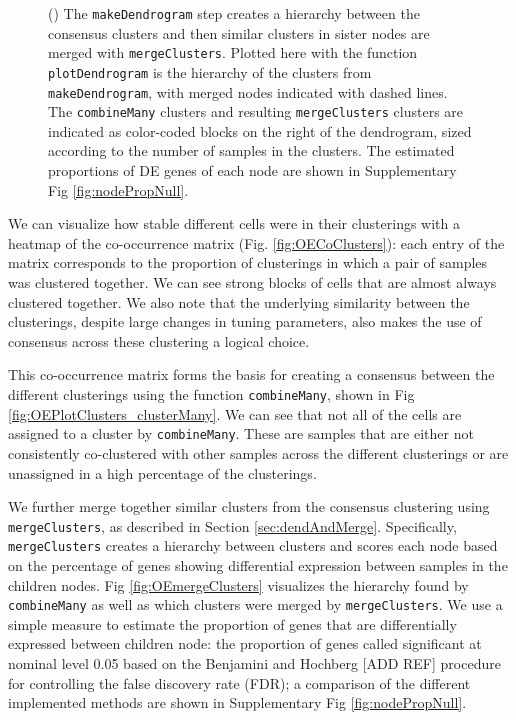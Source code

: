\documentclass[10pt,letterpaper]{article}
\newcommand{\f}[1]{\texttt{#1}}
\begin{document}
\begin{figure}
{(\protect{}) The \f{makeDendrogram} step creates a hierarchy between the consensus clusters and then similar clusters in sister nodes are merged with \f{mergeClusters}. Plotted here with the function \f{plotDendrogram} is the hierarchy of the clusters from \f{makeDendrogram}, with merged nodes indicated with dashed lines. The \f{combineMany} clusters and resulting \f{mergeClusters} clusters are indicated as color-coded blocks on the right of the dendrogram, sized according to the number of samples in the clusters. The estimated proportions of DE genes of each node are shown in Supplementary Fig \ref{fig:nodePropNull}.
	\label{fig:totalProcedure}
}
\end{figure}

We can visualize how stable different cells were in their clusterings with a heatmap of the co-occurrence matrix (Fig. \ref{fig:OECoClusters}): each entry of the matrix corresponds to the proportion of clusterings in which a pair of samples was clustered together. We can see strong blocks of cells that are almost always clustered together. We also note that the underlying similarity between the clusterings, despite large changes in tuning parameters, also makes the use of consensus across these clustering a logical choice.

This co-occurrence matrix forms the basis for creating a consensus between the different clusterings using the function \f{combineMany}, shown in Fig \ref{fig:OEPlotClusters_clusterMany}.
We can see that not all of the cells are assigned to a cluster by \f{combineMany}. These are samples that are either not consistently co-clustered with other samples across the different clusterings or are unassigned in a high percentage of the clusterings.

We further merge together similar clusters from the consensus clustering using \f{mergeClusters}, as described in Section \ref{sec:dendAndMerge}. Specifically, \f{mergeClusters} creates a hierarchy between clusters and scores each node based on the percentage of genes showing differential expression between samples in the children nodes. Fig \ref{fig:OEmergeClusters} visualizes the hierarchy found by \f{combineMany} as well as which clusters were merged by \f{mergeClusters}. We use a simple measure to estimate the proportion of genes that are differentially expressed between children node: the proportion of genes called significant at nominal level 0.05 based on the Benjamini and Hochberg [ADD REF] procedure for controlling the false discovery rate (FDR); a comparison of the different implemented methods are shown in Supplementary Fig \ref{fig:nodePropNull}. 
\end{document}

